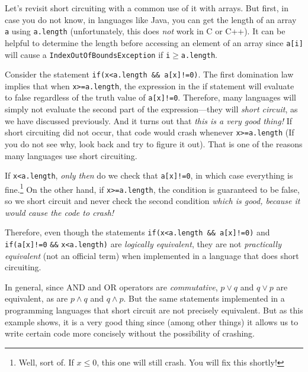 Let's revisit short circuiting with a common use of it with arrays.
But first, in case you do not know, in languages like Java, you can get the length of an array \verb+a+ using \verb+a.length+
(unfortunately, this does {\em not} work in C or C++).
It can be helpful to determine the length before accessing 
an element of an array since \verb+a[i]+ will cause a
\verb+IndexOutOfBoundsException+ if \verb+i+$\geq$\verb+a.length+.

\begin{exa}\label{exa:ss}
Consider the statement \verb+if(x<a.length && a[x]!=0)+.  
The first domination law implies that when \verb+x>=a.length+, the expression in the if statement will evaluate to 
false regardless of the truth value of \verb+a[x]!=0+.  Therefore, many languages will simply
not evaluate the second part of the expression---they will {\em short circuit}, as we have discussed previously.
And it turns out that {\em this is a very good thing!} If
short circuiting did not occur, that code would crash 
whenever \verb+x>=a.length+ (If you do not see why,
look back and try to figure it out). 
That is one of the reasons many 
languages use short circuiting.

If \verb+x<a.length+, {\em only then} do we check that
\verb+a[x]!=0+, in which case everything is 
fine.\footnote{Well, sort of. If $x\leq 0$, this one will still crash.
You will fix this shortly!}
On the other hand, if \verb+x>=a.length+, the condition
is guaranteed to be false, so we short circuit and never check
the second condition {\em which is good, because it would
cause the code to crash!}

Therefore, even though the statements 
\verb+if(x<a.length && a[x]!=0)+ and 
\verb+if(a[x]!=0+ \verb+&&+ \verb+x<a.length)+ 
are {\em logically equivalent}, 
they are not {\em practically equivalent} (not an official term)
when implemented in a language that does short circuiting.

In general, since AND and OR operators are {\em commutative},
$p\vee q$ and $q\vee p$ are equivalent, as are
$p\wedge q$ and $q\wedge p$.
But the same statements implemented in a programming 
languages that short circuit are not precisely equivalent. 
But as this example shows, it is a very good thing since
(among other things) it allows us to write certain code 
more concisely without the possibility of crashing.


\end{exa}
